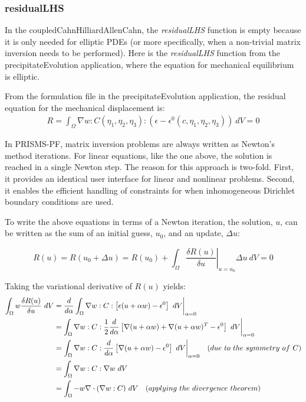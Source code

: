 \documentclass[10pt]{article} %
\begin{document}
\subsubsection{residualLHS}
In the coupledCahnHilliardAllenCahn, the \emph{residualLHS} function is empty because it is only needed for elliptic PDEs (or more specifically, when a non-trivial matrix inversion needs to be performed). Here is the \emph{residualLHS} function from the precipitateEvolution application, where the equation for mechanical equilibrium is elliptic.

From the formulation file in the precipitateEvolution application, the residual equation for the mechanical displacement is:
\begin{gather}
R =  \int_{\Omega}   \nabla w :  C(\eta_1, \eta_2, \eta_3) : \left( \epsilon - \epsilon^0(c,\eta_1, \eta_2, \eta_3)\right) ~dV = 0 \label{LHS_residual_eqn}
\end{gather}

In PRISMS-PF, matrix inversion problems are always written as Newton's method iterations. For linear equations, like the one above, the solution is reached in a single Newton step. The reason for this approach is two-fold. First, it provides an identical user interface for linear and nonlinear problems. Second, it enables the efficient handling of constraints for when inhomogeneous Dirichlet boundary conditions are used.

To write the above equations in terms of a Newton iteration, the solution, $u$, can be written as the sum of an initial guess, $u_0$, and an update, $\Delta u$:

\begin{equation}
R(u) = R(u_0 + \Delta u) = R(u_0) +  \int_{\Omega} \left. \frac{\delta R(u)}{\delta u}\right|_{u=u_0} \Delta u ~dV = 0  \label{matrix_eqn}
\end{equation}

Taking the variational derivative of $R(u)$ yields:
\begin{align}
\int_{\Omega} w \frac{\delta R(u)}{\delta u} ~dV &= \frac{d}{d\alpha} \int_{\Omega}   \nabla w :C: \left[ \epsilon (u+\alpha w) - \epsilon^0 \right] ~dV  \bigg{|}_{\alpha=0} \\
&=  \int_{\Omega}   \nabla w :C: \frac{1}{2}\frac{d}{d\alpha}\left[ \nabla(u+\alpha w) + \nabla(u+\alpha w)^T  - \epsilon^0\right] ~dV \bigg{|}_{\alpha=0}\\
&= \int_{\Omega}   \nabla w :C: \frac{d}{d\alpha} \left[ \nabla(u+\alpha w) - \epsilon^0 \right]  ~dV \bigg{|}_{\alpha=0} \quad (due ~to ~the ~symmetry ~of ~C) \\
&= \int_{\Omega}   \nabla w :C: \nabla w  ~dV  \\
&= \int_{\Omega}   - w \nabla \cdot (\nabla w: C)  ~dV \quad (applying~the~divergence~theorem) 
\end{align}
\end{document}
